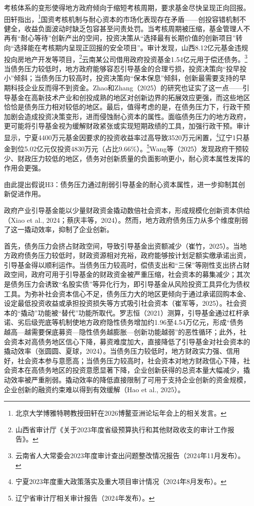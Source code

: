 \documentclass[UTF8,a4paper,zihao=5,fontset=fandol]{ctexart}
\newcommand{\erjfootnote}[1]{\footnote{\hspace*{2em}#1}}
\begin{document}
考核体系的变形使得地方政府倾向于缩短考核周期，要求基金尽快呈现正向回报。田轩指出，\erjfootnote{北京大学博雅特聘教授田轩在2026博鳌亚洲论坛年会上的相关发言。}国资考核机制与耐心资本的市场化表现存在矛盾——创投容错机制不健全，收益负面波动时缺乏包容甚至问责处罚。当考核周期被压缩，基金管理人不再有“耐心等待”创新产出的空间，投资决策从“选择最有长期价值的创新项目”转向“选择能在考核期内呈现正回报的安全项目”。审计发现，山西8.12亿元基金违规投向房地产开发等项目，\erjfootnote{山西省审计厅《关于2023年度省级预算执行和其他财政收支的审计工作报告》。}云南某公司借用政府投资基金1.54亿元用于偿还债务。\erjfootnote{云南省人大常委会2023年度审计查出问题整改情况报告（2024年11月发布）。}当债务压力较低时，地方政府能够容忍引导基金的合理亏损，投资决策向“投早投小”倾斜；当债务压力较高时，投资决策向“保本保息”倾斜，创新最需要支持的早期科技企业反而得不到资金。Zhao和Zhang（2025）的研究也证实了这一点——引导基金在高新技术产业和创投成熟的地区对创新边界的拓展效应更强，而这些地区恰恰是债务压力相对较低的地区。最后，值得考虑的是，在债务压力下，行政干预加剧会造成投资决策变形，进而侵蚀耐心资本的属性。面临债务压力的地方政府，更可能将引导基金视为缓解财政紧张或实现短期政绩的工具，加强行政干预。审计显示，宁夏4400万元基金因要求的投资收益率过高导致3520万元闲置，\erjfootnote{宁夏2023年度重大政策落实及重大项目审计情况（2024年8月发布）。}辽宁1只基金到位5.02亿元仅投资4830万元（占比9.66\%）。\erjfootnote{辽宁省审计厅相关审计报告（2024年发布）。}Wang等（2025）发现政府干预较少、财政压力较低的地区，债务对创新质量的负面影响更小，耐心资本属性发挥的作用会更强。

由此提出假说H3：债务压力通过削弱引导基金的耐心资本属性，进一步抑制其创新促进作用。

政府产业引导基金能以少量财政资金撬动数倍社会资本，形成规模化创新资本供给（Xiao et al., 2024；蔡庆丰等，2024）。然而，地方政府债务压力从多个维度削弱了这一撬动效率，抑制了企业创新。

首先，债务压力会挤占财政空间，导致引导基金出资额减少（崔竹，2025）。当地方政府债务压力较低时，财政资源相对充裕，政府能够按计划足额实缴承诺出资，引导基金得以顺利运作。当债务压力较高时，偿债支出和“三保”等刚性支出挤占财政空间，政府可用于引导基金的财政资金被严重压缩，社会资本的募集减少；其次是债务压力会诱致“名股实债”等异化行为，即引导基金从风险投资工具异化为债权工具。为弥补社会资本信心不足，债务压力大的地区更倾向于通过承诺回购本金、设定最低投资收益或承担投资损失等方式吸引社会资本（崔军等，2025）。社会资本的“撬动”功能被“替代”功能所取代。罗志恒（2021）测算，引导基金通过杠杆承诺、劣后级兜底等机制使地方政府隐性债务增加约1.96至4.54万亿元，形成“债务越高—越需要保底募资—隐性债务越膨胀—创新功能越弱”的恶性循环；此外，社会资本对高债务地区信心下降，募资难度加大，直接降低了引导基金对社会资本的撬动效率（张圆圆、夏球，2024）。当债务压力较低时，地方财政实力强、信用好，社会资本参与意愿高；当债务压力较高时，社会资本对地方财政信心下降，社会资本在高债务地区的投资意愿显著下降，企业创新获得的总资本量大幅减少，撬动效率被严重削弱。撬动效率的降低直接限制了可用于支持企业创新的资金规模，企业创新的融资约束难以得到有效缓解（Hao et al., 2025）。
\end{document}
